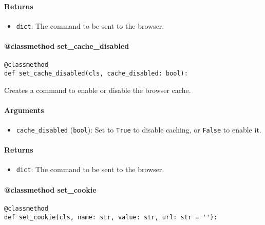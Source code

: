 \documentclass{article}
\begin{document}
\paragraph{Returns}

\begin{itemize}
    \item \lstinline[style=pythonstyle]|dict|: The command to be sent to the browser.
\end{itemize}

\paragraph{@classmethod set\_cache\_disabled}

\begin{lstlisting}[style=pythonstyle]
@classmethod
def set_cache_disabled(cls, cache_disabled: bool):
\end{lstlisting}

\noindent Creates a command to enable or disable the browser cache.

\paragraph{Arguments}

\begin{itemize}
    \item \lstinline[style=pythonstyle]|cache_disabled| (\lstinline[style=pythonstyle]|bool|): Set to \lstinline[style=pythonstyle]|True| to disable caching, or \lstinline[style=pythonstyle]|False| to enable it.
\end{itemize}

\paragraph{Returns}

\begin{itemize}
    \item \lstinline[style=pythonstyle]|dict|: The command to be sent to the browser.
\end{itemize}

\paragraph{@classmethod set\_cookie}

\begin{lstlisting}[style=pythonstyle]
@classmethod
def set_cookie(cls, name: str, value: str, url: str = ''):
\end{lstlisting}
\end{document}
